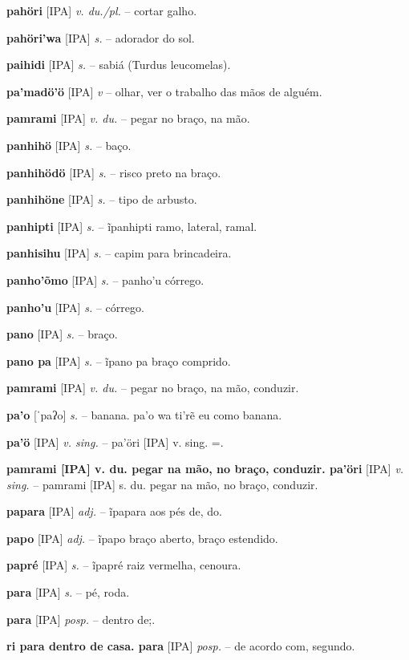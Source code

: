 \textbf{pahöri} [IPA] \textit{v. du./pl.} -- cortar galho.

\textbf{pahöri'wa} [IPA] \textit{s.} -- adorador do sol.

\textbf{paihidi} [IPA] \textit{s.} -- sabiá (Turdus leucomelas).

\textbf{pa'madö'ö} [IPA] \textit{v} -- olhar, ver o trabalho das mãos de alguém.

\textbf{pamrami} [IPA] \textit{v. du.} -- pegar no braço, na mão.

\textbf{panhihö} [IPA] \textit{s.} -- baço.

\textbf{panhihödö} [IPA] \textit{s.} -- risco preto na braço.

\textbf{panhihöne} [IPA] \textit{s.} -- tipo de arbusto.

\textbf{panhipti} [IPA] \textit{s.} -- ĩpanhipti ramo, lateral, ramal.

\textbf{panhisihu} [IPA] \textit{s.} -- capim para brincadeira.

\textbf{panho'õmo} [IPA] \textit{s.} -- panho'u córrego.

\textbf{panho'u} [IPA] \textit{s.} -- córrego.

\textbf{pano} [IPA] \textit{s.} -- braço.

\textbf{pano pa} [IPA] \textit{s.} -- ĩpano pa braço comprido.

\textbf{pamrami} [IPA] \textit{v. du.} -- pegar no braço, na mão, conduzir.

\textbf{pa'o} [ˈpaʔo] \textit{s.} -- banana. pa'o wa ti'rẽ eu como banana.

\textbf{pa'ö} [IPA] \textit{v. sing.} -- pa'öri [IPA] v. sing. =.

\textbf{pamrami [IPA] v. du. pegar na mão, no braço, conduzir. pa'öri} [IPA] \textit{v. sing.} -- pamrami [IPA] s. du. pegar na mão, no braço, conduzir.

\textbf{papara} [IPA] \textit{adj.} -- ĩpapara aos pés de, do.

\textbf{papo} [IPA] \textit{adj.} -- ĩpapo braço aberto, braço estendido.

\textbf{papré} [IPA] \textit{s.} -- ĩpapré raiz vermelha, cenoura.

\textbf{para} [IPA] \textit{s.} -- pé, roda. \href{https://xavante.pythonanywhere.com/static/dicionario/play.html?file=foot.wav}{\faHeadphones}

\textbf{para} [IPA] \textit{posp.} -- dentro de;.

\textbf{ri para dentro de casa. para} [IPA] \textit{posp.} -- de acordo com, segundo.

